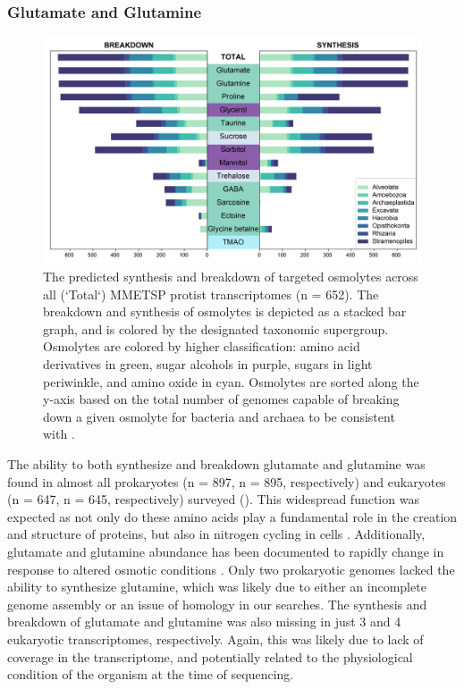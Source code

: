 \documentclass[utf8]{frontiersSCNS} %
\begin{document}
\subsubsection*{Glutamate and Glutamine}
\begin{figure}[t!]
    \centering
    \includegraphics[width = 0.9\columnwidth]{Figures/Eukaryote-Synthesis-Breakdown-v2021-03-14-01.png}
    \caption{The predicted synthesis and breakdown of targeted osmolytes across all (`Total`) MMETSP protist transcriptomes (n = 652). The breakdown and synthesis of osmolytes is depicted as a stacked bar graph, and is colored by the designated taxonomic supergroup. Osmolytes are colored by higher classification: amino acid derivatives in green, sugar alcohols in purple, sugars in light periwinkle, and amino oxide in cyan. Osmolytes are sorted along the y-axis based on the total number of genomes capable of breaking down a given osmolyte for bacteria and archaea to be consistent with .}
    \label{fig:euk}
\end{figure}
The ability to both synthesize and breakdown glutamate and glutamine was found in almost all prokaryotes (n = 897, n = 895, respectively) and eukaryotes (n = 647, n = 645, respectively) surveyed (). This widespread function was expected as not only do these amino acids play a fundamental role in the creation and structure of proteins, but also in nitrogen cycling in cells \citep{Reitzer2003}. Additionally, glutamate and glutamine abundance has been documented to rapidly change in response to altered osmotic conditions \citep{Saum2008}. Only two prokaryotic genomes lacked the ability to synthesize glutamine, which was likely due to either an incomplete genome assembly or an issue of homology in our searches. The synthesis and breakdown of glutamate and glutamine was also missing in just 3 and 4 eukaryotic transcriptomes, respectively. Again, this was likely due to lack of coverage in the transcriptome, and potentially related to the physiological condition of the organism at the time of sequencing.
\end{document}
